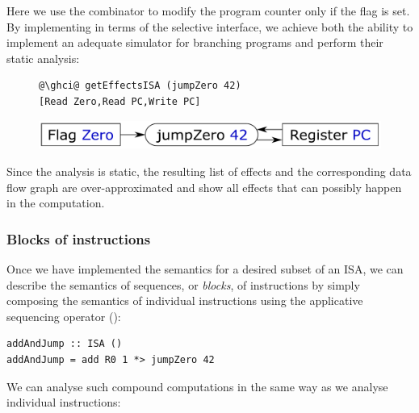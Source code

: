 \noindent
Here we use the  combinator to modify the program counter only if
the  flag is set. By implementing  in terms of the
selective interface, we achieve both the ability to implement an adequate
simulator for branching programs and perform their static analysis:

\begin{figure}[!h]
 \begin{minipage}{0.43\textwidth}
\raggedleft
\begin{verbatim}
@\ghci@ getEffectsISA (jumpZero 42)
[Read Zero,Read PC,Write PC]
\end{verbatim}
 \end{minipage}
 \begin{minipage}{0.54\textwidth}
  \centering
  \includegraphics[scale=0.3]{fig/jumpZero.pdf}
 \end{minipage}
\end{figure}

\noindent
Since the analysis is static, the resulting list of effects and the
corresponding data flow graph are over-approximated and show all effects that
can possibly happen in the computation.


\subsubsection{Blocks of instructions}

Once we have implemented the semantics for a desired subset of an ISA, we can
describe the semantics of sequences, or \emph{blocks}, of instructions by
simply composing the semantics of individual instructions using the applicative
sequencing operator (\hs{*>}):

\vspace{1mm}
\begin{verbatim}
addAndJump :: ISA ()
addAndJump = add R0 1 *> jumpZero 42
\end{verbatim}
\newpage

\noindent
We can analyse such compound computations in the same way as we analyse
individual instructions:

